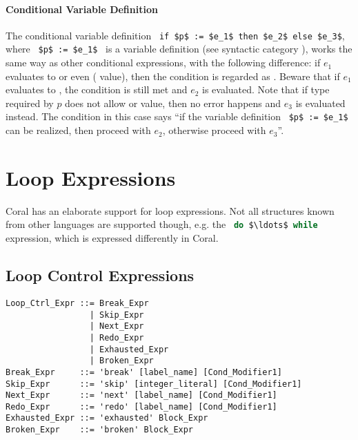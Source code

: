 \paragraph{Conditional Variable Definition}
The conditional variable definition ~\lstinline!if $p$ := $e_1$ then $e_2$ else $e_3$!, where ~\lstinline!$p$ := $e_1$!~ is a variable definition (see syntactic category ), works the same way as other conditional expressions, with the following difference: if $e_1$ evaluates to  or even \code{()} ( value), then the condition is regarded as . Beware that if $e_1$ evaluates to , the condition is still met and $e_2$ is evaluated. Note that if type required by $p$ does not allow  or \code{()} value, then no error happens and $e_3$ is evaluated instead. The condition in this case says ``if the variable definition ~\lstinline!$p$ := $e_1$!~ can be realized, then proceed with $e_2$, otherwise proceed with $e_3$''. 






\section{Loop Expressions}

Coral has an elaborate support for loop expressions. Not all structures known from other languages are supported though, e.g. the ~\lstinline[language=Java]!do $\ldots$ while!~ expression, which is expressed differently in Coral. 






\subsection{Loop Control Expressions}
\label{sec:loop-control-expressions}

\syntax\begin{lstlisting}
Loop_Ctrl_Expr ::= Break_Expr
                 | Skip_Expr
                 | Next_Expr
                 | Redo_Expr
                 | Exhausted_Expr
                 | Broken_Expr
Break_Expr     ::= 'break' [label_name] [Cond_Modifier1]
Skip_Expr      ::= 'skip' [integer_literal] [Cond_Modifier1]
Next_Expr      ::= 'next' [label_name] [Cond_Modifier1]
Redo_Expr      ::= 'redo' [label_name] [Cond_Modifier1]
Exhausted_Expr ::= 'exhausted' Block_Expr
Broken_Expr    ::= 'broken' Block_Expr
\end{lstlisting}


